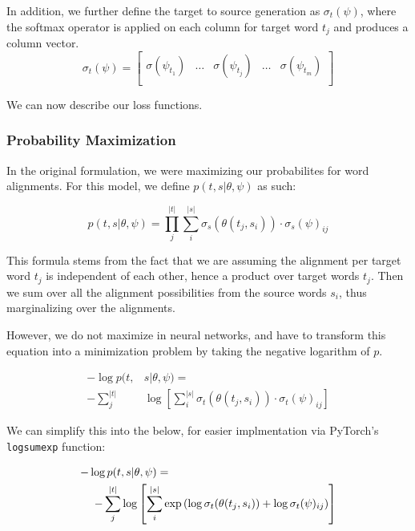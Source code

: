 \documentclass[twoside,twocolumn]{article}
\begin{document}
In addition, we further define the target to source generation as $\sigma_t(\psi)$, where the softmax operator is applied on each column for target word $t_j$ and produces a column vector.
\begin{equation}
  \sigma_t(\psi) = \left[
    \begin{matrix}
      \sigma(\psi_{t_1}) &
      \hdots &
      \sigma(\psi_{t_j}) &
      \hdots &
      \sigma(\psi_{t_m})  \\
    \end{matrix}
\right]
\end{equation}

We can now describe our loss functions.

\subsubsection{Probability Maximization}
In the original formulation, we were maximizing our probabilites for word alignments. For this model, we define $p(t, s | \theta, \psi)$ as such:

\begin{equation}
  p(t, s | \theta, \psi) = \prod_j^{|t|} \sum_i^{|s|} \sigma_s(\theta(t_j, s_i)) \cdot \sigma_s(\psi)_{ij}
\end{equation}

This formula stems from the fact that we are assuming the alignment per target word $t_j$ is independent of each other, hence a product over target words $t_j$. Then we sum over all the alignment possibilities from the source words $s_i$, thus marginalizing over the alignments.

However, we do not maximize in neural networks, and have to transform this equation into a minimization problem by taking the negative logarithm of $p$.

\begin{equation}
  \begin{split}
  -\log p(t, & s | \theta, \psi) = \\
  - \sum_j^{|t|} & \log \left[ \sum_i^{|s|} \sigma_t \left( \theta(t_j, s_i) \right) \cdot \sigma_t(\psi)_{ij} \right]
\end{split}
\end{equation}

We can simplify this into the below, for easier implmentation via PyTorch's \texttt{logsumexp} function:

\begin{equation}
  \centering
  \begin{split}
  -\log  p(t & , s | \theta, \psi) = \\
  - \sum_j^{|t|} & \log \left[ \sum_i^{|s|} \exp \left( \log \sigma_t(\theta(t_j, s_i)) + \log \sigma_t(\psi)_{ij} \right) \right]
\end{split}
\end{equation}
\end{document}

